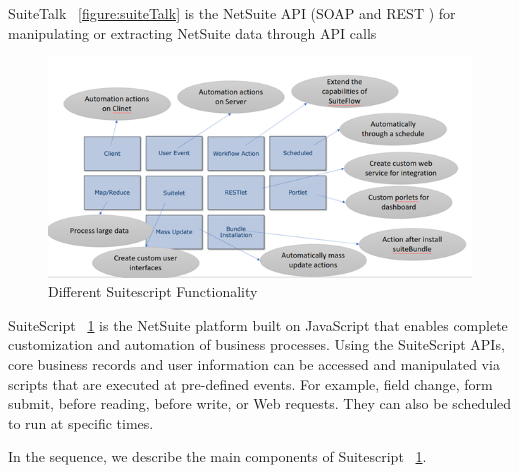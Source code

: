 SuiteTalk ~\ref{figure:suiteTalk} is the NetSuite API (SOAP and REST ) for manipulating or extracting NetSuite data through API calls


\begin{figure}[!htb]
    \centering 
    \includegraphics[scale=0.7]{resource/suitescript.png}
    \caption{Different Suitescript Functionality}
    \label{figure:suiteScript}
\end{figure}


SuiteScript ~\ref{figure:suiteScript} is the NetSuite platform built on JavaScript that enables complete customization and automation of business processes. Using the SuiteScript APIs, core business records and user information can be accessed and manipulated via scripts that are executed at pre-defined events. For example, field change, form submit, before reading, before write, or Web requests. They can also be scheduled to run at specific times.

In the sequence, we describe the main components of Suitescript ~\ref{figure:suiteScript}.

